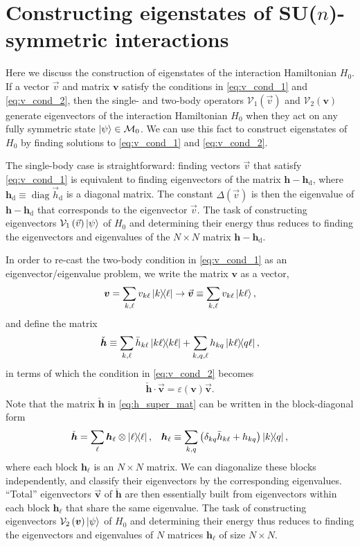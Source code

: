 \documentclass[nofootinbib,notitlepage,11pt]{revtex4-2}
\newcommand{\p}[1]{\left(#1\right)} %
\renewcommand{\c}{\cdot} %
\newcommand{\m}{\bm} %
\renewcommand{\v}{\vec} %
\newcommand{\1}{\mathds{1}}
\renewcommand{\d}{\text{d}}
\newcommand{\e}{\varepsilon}
\newcommand{\M}{\mathcal{M}}
\newcommand{\V}{\mathcal{V}}
\DeclareMathOperator{\diag}{diag}
\begin{document}
\section{Constructing eigenstates of SU($n$)-symmetric interactions}

Here we discuss the construction of eigenstates of the interaction
Hamiltonian $H_0$.  If a vector $\v v$ and matrix $\m v$ satisfy the
conditions in \eqref{eq:v_cond_1} and \eqref{eq:v_cond_2}, then the
single- and two-body operators $\V_1\p{\v v}$ and $\V_2\p{\m v}$
generate eigenvectors of the interaction Hamiltonian $H_0$ when they
act on any fully symmetric state $\ket\psi\in\M_0$.  We can use this
fact to construct eigenstates of $H_0$ by finding solutions to
\eqref{eq:v_cond_1} and \eqref{eq:v_cond_2}.

The single-body case is straightforward: finding vectors $\v v$ that
satisfy \eqref{eq:v_cond_1} is equivalent to finding eigenvectors of
the matrix $\m h-\m h_\d$, where $\m h_\d\equiv\diag\v h_\d$ is a
diagonal matrix.  The constant $\Delta\p{\v v}$ is then the eigenvalue
of $\m h-\m h_\d$ that corresponds to the eigenvector $\v v$.  The
task of constructing eigenvectors $\V_1\p{\v v}\ket\psi$ of $H_0$ and
determining their energy thus reduces to finding the eigenvectors and
eigenvalues of the $N\times N$ matrix $\m h-\m h_\d$.

In order to re-cast the two-body condition in \eqref{eq:v_cond_1} as
an eigenvector/eigenvalue problem, we write the matrix $\m v$ as a
vector,
\begin{align}
  \m v = \sum_{k,\ell} v_{k\ell} \op{k}{\ell}
  \to \v{\m v} \equiv \sum_{k,\ell} v_{k\ell} \ket{k\ell},
\end{align}
and define the matrix
\begin{align}
  \check{\m h}
  \equiv \sum_{k,\ell} \bar h_{k\ell} \op{k\ell}
  + \sum_{k,q,\ell} h_{kq} \op{k\ell}{q\ell},
  \label{eq:h_super_mat}
\end{align}
in terms of which the condition in \eqref{eq:v_cond_2} becomes
\begin{align}
  \check{\m h} \c \v{\m v} = \e\p{\m v} \v{\m v}.
\end{align}
Note that the matrix $\check{\m h}$ in \eqref{eq:h_super_mat} can be
written in the block-diagonal form
\begin{align}
  \check{\m h} = \sum_\ell \m h_\ell \otimes \op{\ell},
  &&
  \m h_\ell
  \equiv \sum_{k,q}\p{\delta_{kq} \bar h_{k\ell} + h_{kq}} \op{k}{q},
\end{align}
where each block $\m h_\ell$ is an $N\times N$ matrix.  We can
diagonalize these blocks independently, and classify their
eigenvectors by the corresponding eigenvalues.  ``Total'' eigenvectors
$\v{\m v}$ of $\check{\m h}$ are then essentially built from
eigenvectors within each block $\m h_\ell$ that share the same
eigenvalue.  The task of constructing eigenvectors
$\V_2\p{\m v}\ket\psi$ of $H_0$ and determining their energy thus
reduces to finding the eigenvectors and eigenvalues of $N$ matrices
$\m h_\ell$ of size $N\times N$.
\end{document}
